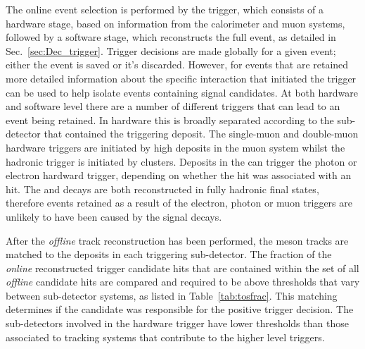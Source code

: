 The online event selection is performed by the \lhcb trigger, which consists of a hardware stage, based on information from the calorimeter and muon systems, followed by a software stage, which reconstructs the full event, as detailed in Sec.~\ref{sec:Dec_trigger}. 
Trigger decisions are made globally for a given event; either the event is saved or it's discarded. However, for events that are retained more detailed information about the specific interaction that initiated the trigger can be used to help isolate events containing signal candidates. At both hardware and software level there are a number of different triggers that can lead to an event being retained. In hardware this is broadly separated according to the sub-detector that contained the triggering deposit. 
The single-muon and double-muon hardware triggers are initiated by high \pt deposits in the muon system whilst the hadronic trigger is initiated by \hcal clusters. 
Deposits in the \ecal can trigger the photon or electron hardward trigger, depending on whether the hit was associated with an \spd hit.
The \decay{\Bp}{\Dsp\Kp\Km} and \decay{\Bp}{\Dsp}{\phiz} decays are both reconstructed in fully hadronic final states, therefore events retained as a result of the electron, photon or muon triggers are unlikely to have been caused by the signal decays. 

After the \emph{offline} track reconstruction has been performed, the \Bp meson tracks are matched to the deposits in each triggering sub-detector.
The fraction of the \emph{online} reconstructed trigger candidate hits that are contained within the set of all \emph{offline} \Bp candidate hits are compared and required to be above thresholds that vary between sub-detector systems, as listed in Table~\ref{tab:tosfrac}. This matching determines if the candidate was responsible for the positive trigger decision. The sub-detectors involved in the hardware trigger have lower thresholds than those associated to tracking systems that contribute to the higher level triggers.  

